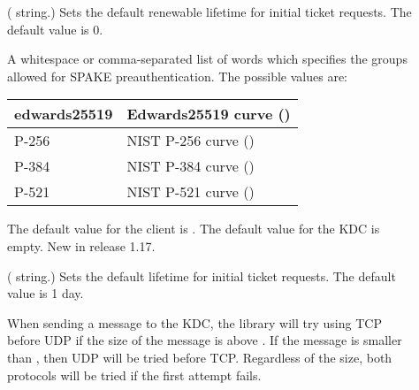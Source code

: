 \documentclass[letterpaper,10pt,english]{sphinxmanual}
\begin{document}
\begin{description}
\item[{}] \leavevmode
( string.)  Sets the default renewable lifetime
for initial ticket requests.  The default value is 0.

\item[{}] \leavevmode
A whitespace or comma-separated list of words which specifies the
groups allowed for SPAKE preauthentication.  The possible values
are:


\begin{savenotes}\sphinxattablestart
\centering
\begin{tabulary}{\linewidth}[t]{|T|T|}
\hline

edwards25519
&
Edwards25519 curve ()
\\
\hline
P-256
&
NIST P-256 curve ()
\\
\hline
P-384
&
NIST P-384 curve ()
\\
\hline
P-521
&
NIST P-521 curve ()
\\
\hline
\end{tabulary}
\par
\sphinxattableend\end{savenotes}

The default value for the client is .  The default
value for the KDC is empty.  New in release 1.17.

\item[{}] \leavevmode
( string.)  Sets the default lifetime for initial
ticket requests.  The default value is 1 day.

\item[{}] \leavevmode
When sending a message to the KDC, the library will try using TCP
before UDP if the size of the message is above
.  If the message is smaller than
, then UDP will be tried before TCP.
Regardless of the size, both protocols will be tried if the first
attempt fails.


\end{description}
\end{document}
